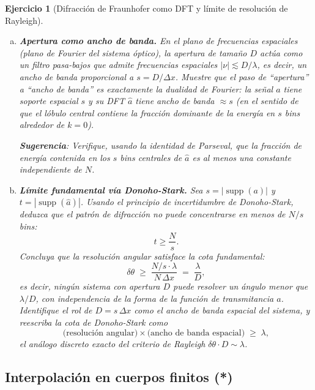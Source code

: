 \documentclass[12pt]{article}
\newtheorem{exercise}{Ejercicio}
\begin{document}
\begin{exercise}[Difracción de Fraunhofer como DFT y límite de resolución de Rayleigh]
\begin{enumerate}[(a)]
\item \textbf{Apertura como ancho de banda.}
En el plano de frecuencias espaciales (plano de Fourier del sistema óptico), la apertura de tamaño $D$ actúa como un filtro pasa-bajos que admite frecuencias espaciales $|\nu| \lesssim D/\lambda$, es decir, un ancho de banda proporcional a $s = D/\Delta x$.
Muestre que el paso de ``apertura'' a ``ancho de banda'' es exactamente la dualidad de Fourier: la señal $a$ tiene soporte espacial $s$ y su DFT $\hat{a}$ tiene ancho de banda $\approx s$ (en el sentido de que el lóbulo central contiene la fracción dominante de la energía en $s$ bins alrededor de $k = 0$).

\textbf{Sugerencia}: Verifique, usando la identidad de Parseval, que la fracción de energía contenida en los $s$ bins centrales de $\hat{a}$ es al menos una constante independiente de $N$.

\item \textbf{Límite fundamental vía Donoho-Stark.}
Sea $s = |\operatorname{supp}(a)|$ y $t = |\operatorname{supp}(\hat{a})|$.
Usando el principio de incertidumbre de Donoho-Stark, deduzca que el patrón de difracción no puede concentrarse en menos de $N/s$ bins:
\[
t \geq \frac{N}{s}.
\]
Concluya que la resolución angular satisface la cota \emph{fundamental}:
\[
\delta\theta \;\geq\; \frac{N/s \cdot \lambda}{N\,\Delta x} \;=\; \frac{\lambda}{D},
\]
es decir, ningún sistema con apertura $D$ puede resolver un ángulo menor que $\lambda/D$, con independencia de la forma de la función de transmitancia $a$.
Identifique el rol de $D = s\,\Delta x$ como el \emph{ancho de banda espacial} del sistema, y reescriba la cota de Donoho-Stark como
\[
\text{(resolución angular)} \times \text{(ancho de banda espacial)} \;\geq\; \lambda,
\]
el análogo discreto exacto del criterio de Rayleigh $\delta\theta \cdot D \sim \lambda$.
\end{enumerate}
\end{exercise}



\subsection*{Interpolación en cuerpos finitos (*)}
\end{document}
